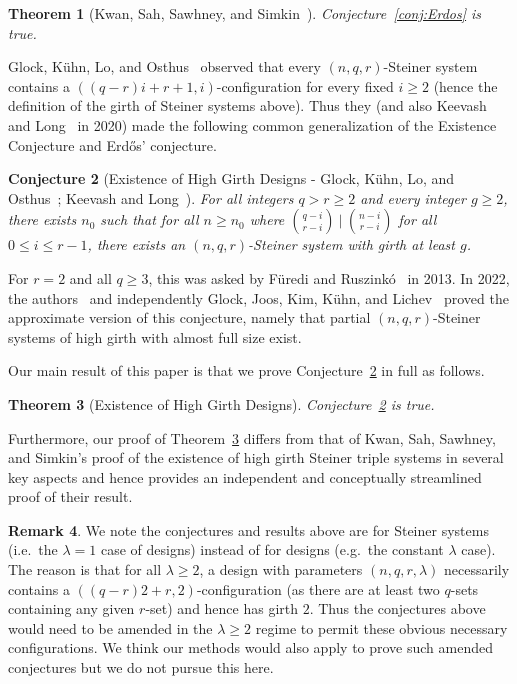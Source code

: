 \documentclass[11pt]{article}
\newcounter{i}
\theoremstyle{plain}
\newtheorem{thm}{Theorem}[section]
\newtheorem{conj}[thm]{Conjecture}
\theoremstyle{plain} %
\theoremstyle{definition}
\newtheorem{remark}[thm]{Remark}
\begin{document}
\begin{thm}[Kwan, Sah, Sawhney, and Simkin~\cite{KSSS22}]
Conjecture~\ref{conj:Erdos} is true.    
\end{thm}

Glock, K\"{u}hn, Lo, and Osthus~\cite{GKLO20} observed that every $(n,q,r)$-Steiner system contains a $((q-r)i+r+1,i)$-configuration for every fixed $i\ge 2$ (hence the definition of the girth of Steiner systems above). Thus they (and also Keevash and Long~\cite{KL20} in 2020) made the following common generalization of the Existence Conjecture and Erd\H{o}s' conjecture.

\begin{conj}[Existence of High Girth Designs - Glock, K\"{u}hn, Lo, and Osthus~\cite{GKLO20}; Keevash and Long~\cite{KL20}]\label{conj:HighGirthAllUniformities}
For all integers $q > r \geq 2$ and every integer $g\ge 2$, there exists $n_0$ such that for all $n\ge n_0$ where $\binom{q-i}{r-i}~|~\binom{n-i}{r-i}$ for all $0\le i \le r-1$, there exists an $(n,q,r)$-Steiner system with girth at least $g$.%
\end{conj}

For $r=2$ and all $q\geq 3$, this was asked by F\"uredi and Ruszink\'o~\cite{FR13} in 2013. In 2022, the authors~\cite{DP22} and independently Glock, Joos, Kim, K\"uhn, and Lichev~\cite{GJKKL22} proved the approximate version of this conjecture, namely that partial $(n,q,r)$-Steiner systems of high girth with almost full size exist.

Our main result of this paper is that we prove Conjecture~\ref{conj:HighGirthAllUniformities} in full as follows.

\begin{thm}[Existence of High Girth  Designs]\label{thm:HighGirthSteiner}
Conjecture~\ref{conj:HighGirthAllUniformities} is true.
\end{thm}

Furthermore, our proof of Theorem~\ref{thm:HighGirthSteiner} differs from that of Kwan, Sah, Sawhney, and Simkin's proof of the existence of high girth Steiner triple systems in several key aspects and hence provides an independent and conceptually streamlined proof of their result. 

\begin{remark} We note the conjectures and results above are for Steiner systems (i.e.~the $\lambda=1$ case of designs) instead of for designs (e.g.~the constant $\lambda$ case). The reason is that for all $\lambda \ge 2$, a design with parameters $(n,q,r,\lambda)$ necessarily contains a $((q-r)2+r,2)$-configuration (as there are at least two $q$-sets containing any given $r$-set) and hence has girth $2$. Thus the conjectures above would need to be amended in the $\lambda\ge 2$ regime to permit these obvious necessary configurations. We think our methods would also apply to prove such amended conjectures but we do not pursue this here.
\end{remark}
\end{document}
